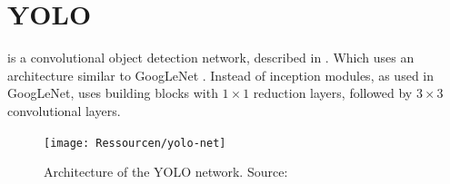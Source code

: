 \section{YOLO}
 is a convolutional object detection network, described in \cite{Redmon2016}. Which uses an architecture similar to GoogLeNet \cite{Szegedy2014}. Instead of inception modules, as used in GoogLeNet, \cite{Redmon2016} uses building blocks with $1\times1$ reduction layers, followed by $3\times3$ convolutional layers. 

\begin{figure}[ht]
	\centering
	\texttt{[image: Ressourcen/yolo-net]}
	\caption[Architecture of the YOLO network.]{Architecture of the YOLO network. Source: \cite{Redmon2016}}
	\label{fig:yolo-net}
\end{figure}


	